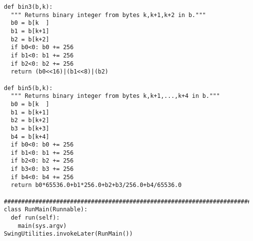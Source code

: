 \documentclass[11pt]{article}
\begin{document}
\begin{enumerate}
\begin{lstlisting}
def bin3(b,k):
  """ Returns binary integer from bytes k,k+1,k+2 in b."""
  b0 = b[k  ]
  b1 = b[k+1]
  b2 = b[k+2] 
  if b0<0: b0 += 256
  if b1<0: b1 += 256
  if b2<0: b2 += 256
  return (b0<<16)|(b1<<8)|(b2)

def bin5(b,k):
  """ Returns binary integer from bytes k,k+1,...,k+4 in b."""
  b0 = b[k  ]
  b1 = b[k+1]
  b2 = b[k+2] 
  b3 = b[k+3] 
  b4 = b[k+4] 
  if b0<0: b0 += 256
  if b1<0: b1 += 256
  if b2<0: b2 += 256
  if b3<0: b3 += 256
  if b4<0: b4 += 256
  return b0*65536.0+b1*256.0+b2+b3/256.0+b4/65536.0

#############################################################################
class RunMain(Runnable):
  def run(self):
    main(sys.argv)
SwingUtilities.invokeLater(RunMain()) 
\end{lstlisting}
\end{enumerate}
\end{document}
